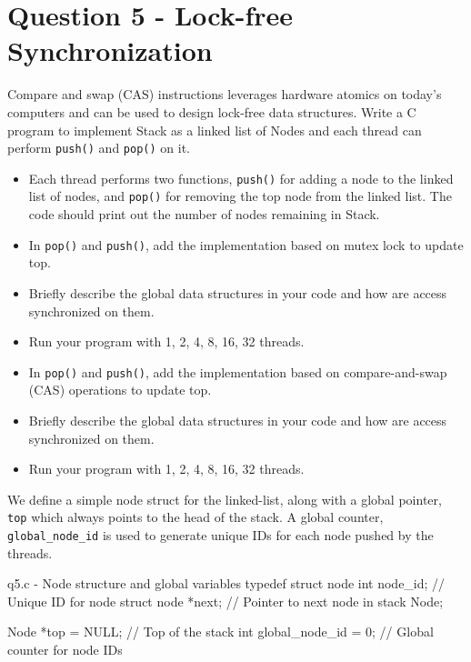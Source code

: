 \documentclass[../main.tex]{subfiles}
\begin{document}
\newpage

\section{Question 5 - Lock-free Synchronization}

Compare and swap (CAS) instructions leverages hardware atomics on today's computers and can be used to design lock-free data structures. Write a C program to implement Stack as a linked list of Nodes and each thread can perform \lstinline{push()} and \lstinline{pop()} on it.

\begin{itemize}
    \item Each thread performs two functions, \lstinline{push()} for adding a node to the linked list of nodes, and \lstinline{pop()} for removing the top node from the linked list. The code should print out the number of nodes remaining in Stack.
    \item In \lstinline{pop()} and \lstinline{push()}, add the implementation based on mutex lock to update top.
    \item Briefly describe the global data structures in your code and how are access synchronized on them.
    \item Run your program with 1, 2, 4, 8, 16, 32 threads.
    \item In \lstinline{pop()} and \lstinline|push()|, add the implementation based on compare-and-swap (CAS) operations to update top.
    \item Briefly describe the global data structures in your code and how are access synchronized on them.
    \item Run your program with 1, 2, 4, 8, 16, 32 threads.
\end{itemize}

\solution

We define a simple node struct for the linked-list, along with a global pointer, \texttt{top} which always points to the head of the stack. A global counter, \texttt{global\_node\_id} is used to generate unique IDs for each node pushed by the threads.

\begin{cppcode}{q5.c - Node structure and global variables}
typedef struct node {
    int node_id;        // Unique ID for node
    struct node *next;  // Pointer to next node in stack
} Node;

Node *top = NULL;       // Top of the stack
int global_node_id = 0; // Global counter for node IDs
\end{cppcode}
\end{document}
